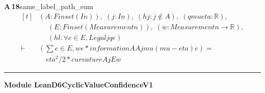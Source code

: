 \documentclass[conference]{IEEEtran}
\theoremstyle{definition}
\newcommand{\lean}[1]{\textsf{\footnotesize #1}}
\begin{document}
\noindent\textbf{A\,18}\quad\lean{same\_label\_path\_sum}
{\footnotesize\[ \begin{aligned}[t]
&(\mathit{A} : \mathit{Finset} (\mathit{I} \mathit{n})),\; (\mathit{j} : \mathit{I} \mathit{n}),\; (\mathit{hj} : \mathit{j} \notin \mathit{A}),\; (\mathit{q} \mathit{mu} \mathit{eta} : \mathbb{R} ),\\
&\quad \; (\mathit{E} : \mathit{Finset} (\mathit{Measurement} \mathit{n})),\; (\mathit{w} : \mathit{Measurement} \mathit{n} \to \mathbb{R} ),\\
&\quad \; (\mathit{hl} : \forall \mathit{e} \in \mathit{E}, \mathit{Legal} \mathit{j} \mathit{q} \mathit{e})\\
\vdash\;&(\textstyle\sum \mathit{e} \in \mathit{E}, \mathit{w} \mathit{e} * \mathit{information} \mathit{A} \mathit{A} \mathit{j} \mathit{mu} (\mathit{mu}-\mathit{eta}) \mathit{e}) =\\
&\quad \mathit{eta}^{2}/2 * \mathit{curvature} \mathit{A} \mathit{j} \mathit{E} \mathit{w}
\end{aligned} \]}

\vspace{4pt}\noindent\rule{\columnwidth}{0.4pt}\par\vspace{2pt}
\noindent\textbf{Module \lean{LeanD6CyclicValueConfidenceV1}}\par\vspace{3pt}
\end{document}
